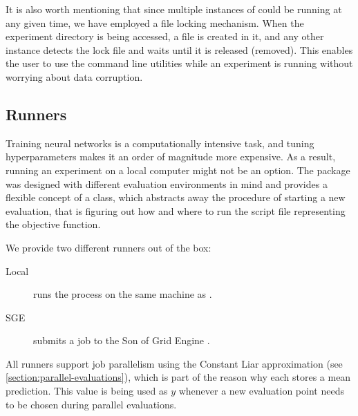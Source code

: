 It is also worth mentioning that since multiple instances of \bopt could be running at any given time, we have employed a file locking mechanism. When the experiment directory is being accessed, a  file is created in it, and any other \bopt instance detects the lock file and waits until it is released (removed). This enables the user to use the command line utilities while an experiment is running without worrying about data corruption.

\subsection{Runners}
\label{section:runners}

Training neural networks is a computationally intensive task, and tuning hyperparameters makes it an order of magnitude more expensive. As a result, running an experiment on a local computer might not be an option. The package was designed with different evaluation environments in mind and provides a flexible concept of a  class, which abstracts away the procedure of starting a new evaluation, that is figuring out how and where to run the script file representing the objective function.

We provide two different runners out of the box:

\begin{description}
    \item[Local] runs the process on the same machine as \bopt.
    \item[SGE] submits a job to the Son of Grid Engine \citep{sge}.
\end{description}

All runners support job parallelism using the Constant Liar approximation (see \autoref{section:parallel-evaluations}), which is part of the reason why each  stores a mean prediction. This value is being used as $y$ whenever a new evaluation point needs to be chosen during parallel evaluations.

